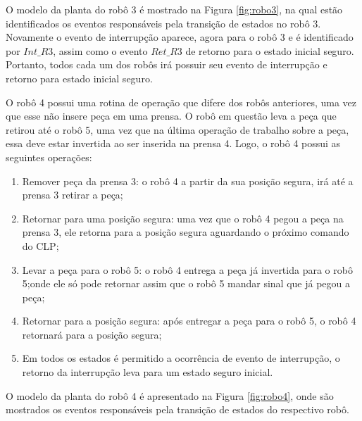 O modelo da planta do robô 3 é mostrado na Figura \ref{fig:robo3}, na qual estão identificados os eventos responsáveis pela transição de estados no robô 3. Novamente o evento de interrupção aparece, agora para o robô 3 e é identificado por $Int\_R3$, assim como o evento $Ret\_R3$ de retorno para o estado inicial seguro. Portanto, todos cada um dos robôs irá possuir seu evento de interrupção e retorno para estado inicial seguro.

O robô 4 possui uma rotina de operação que difere dos robôs anteriores, uma vez que esse não insere peça em uma prensa. O robô em questão leva a peça que retirou até o robô 5, uma vez que na última operação de trabalho sobre a peça, essa deve estar invertida ao ser inserida na prensa 4. Logo, o robô 4 possui as seguintes operações:

\begin{enumerate}
	\item Remover peça da prensa 3: o robô 4 a partir da sua posição segura, irá até a prensa 3 retirar a peça;
	
	\item Retornar para uma posição segura: uma vez que o robô 4 pegou a peça na prensa 3, ele retorna para a posição segura aguardando o próximo comando do CLP;
	
	\item Levar a peça para o robô 5: o robô 4 entrega a peça já invertida para o robô 5;onde ele só pode retornar assim que o robô 5 mandar sinal que já pegou a peça; 
	
	\item Retornar para a posição segura: após entregar a peça para o robô 5, o robô 4 retornará para a posição segura;
	
	\item Em todos os estados é permitido a ocorrência de evento de interrupção, o retorno da interrupção leva para um estado seguro inicial.
\end{enumerate}

O modelo da planta do robô 4 é apresentado na Figura \ref{fig:robo4}, onde são mostrados os eventos responsáveis pela transição de estados do respectivo robô.

